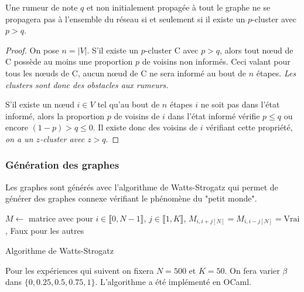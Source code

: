 \documentclass{article}
\begin{document}
\begin{theo}
  Une rumeur de note $q$ et non initialement propagée à tout le graphe ne se propagera pas à l'ensemble du réseau si et seulement si il existe un $p$-cluster avec $p>q$.
\end{theo}
\begin{proof}
  On pose $n=|V|$.
  S'il existe un $p$-cluster C avec $p>q$, alors tout nœud de C possède au moins une proportion $p$ de voisins non informés. Ceci valant pour tous les nœuds de C, aucun nœud de C ne sera informé au bout de $n$ étapes. \emph{Les clusters sont donc des obstacles aux rumeurs.}

  S'il existe un nœud $i\in V$ tel qu'au bout de $n$ étapes $i$ ne soit pas dans l'état informé, alors la proportion $p$ de voisins de $i$ dans l'état informé vérifie $p \leq q$ ou encore $(1-p) > q \leq 0$. Il existe donc des voisins de $i$ vérifiant cette propriété, \emph{on a un $z$-cluster avec $z>q$}.
\end{proof}

\subsubsection{Génération des graphes}

Les graphes sont générés avec l'algorithme de Watts-Strogatz qui permet de générer des graphes connexe vérifiant le phénomène du "petit monde".

\begin{algorithm}
$M \leftarrow $ matrice avec pour $i\in \llbracket0,N-1\rrbracket$, $j\in \llbracket1,K\rrbracket$, $M_{i,i+j[N]} = M_{i,i-j[N]} = \text{Vrai}$, Faux pour les autres \;
\caption{Algorithme de Watts-Strogatz}
\end{algorithm}

Pour les expériences qui suivent on fixera $N=500$ et $K=50$. On fera varier $\beta$ dans $\{0,0.25,0.5,0.75,1\}$. L'algorithme a été implémenté en OCaml.
\end{document}
